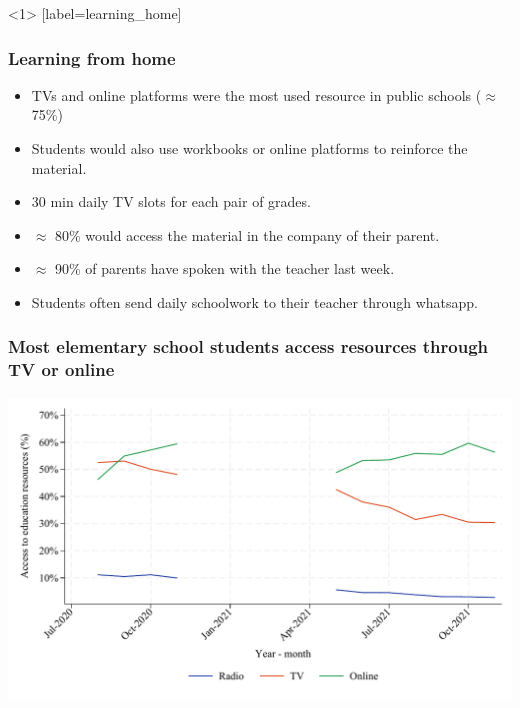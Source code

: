 \documentclass{beamer}
\begin{document}
\begin{frame}<1>
    [label=learning_home]
    \frametitle{Learning from home}
    \begin{itemize}
       \item TVs and online platforms were the most used resource in public schools ($\approx$ 75\%)
       \item Students would also use workbooks or online platforms to reinforce the material.
       \item 30 min daily TV slots for each pair of grades.
         \item {} $\approx$ 80\% would access the material in the company of their parent.
        \item {} $\approx$ 90\% of parents have spoken with the teacher last week.
        \item {} Students often send daily schoolwork to their teacher through whatsapp.
    \end{itemize}
\end{frame}

\begin{frame}
    \label{frame:access}
    \frametitle{Most elementary school students access resources through  TV or online}
               \includegraphics[width=\textwidth]{./FIGURES/Descriptive/SER_access_elm.pdf}    
    
\end{frame}

\end{document}
